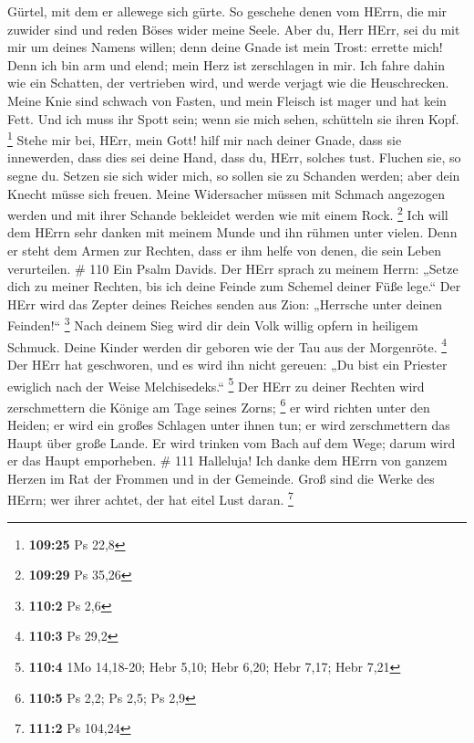 Gürtel, mit dem er allewege sich gürte.  So geschehe denen
vom HErrn, die mir zuwider sind und reden Böses wider meine Seele.
 Aber du, Herr HErr, sei du mit mir um deines Namens
willen; denn deine Gnade ist mein Trost: errette mich! 
Denn ich bin arm und elend; mein Herz ist zerschlagen in mir.
 Ich fahre dahin wie ein Schatten, der vertrieben wird, und
werde verjagt wie die Heuschrecken.  Meine Knie sind
schwach von Fasten, und mein Fleisch ist mager und hat kein Fett.
 Und ich muss ihr Spott sein; wenn sie mich sehen,
schütteln sie ihren Kopf. \footnote{\textbf{109:25} Ps 22,8}
 Stehe mir bei, HErr, mein Gott! hilf mir nach deiner
Gnade,  dass sie innewerden, dass dies sei deine Hand, dass
du, HErr, solches tust.  Fluchen sie, so segne du. Setzen
sie sich wider mich, so sollen sie zu Schanden werden; aber dein Knecht
müsse sich freuen.  Meine Widersacher müssen mit Schmach
angezogen werden und mit ihrer Schande bekleidet werden wie mit einem
Rock. \footnote{\textbf{109:29} Ps 35,26}  Ich will dem
HErrn sehr danken mit meinem Munde und ihn rühmen unter vielen.
 Denn er steht dem Armen zur Rechten, dass er ihm helfe von
denen, die sein Leben verurteilen. \# 110  Ein Psalm Davids.
Der HErr sprach zu meinem Herrn: „Setze dich zu meiner Rechten, bis ich
deine Feinde zum Schemel deiner Füße lege.``  Der HErr wird
das Zepter deines Reiches senden aus Zion: „Herrsche unter deinen
Feinden!{}`` \footnote{\textbf{110:2} Ps 2,6}  Nach deinem
Sieg wird dir dein Volk willig opfern in heiligem Schmuck. Deine Kinder
werden dir geboren wie der Tau aus der Morgenröte. \footnote{\textbf{110:3}
  Ps 29,2}  Der HErr hat geschworen, und es wird ihn nicht
gereuen: „Du bist ein Priester ewiglich nach der Weise Melchisedeks.``
\footnote{\textbf{110:4} 1Mo 14,18-20; Hebr 5,10; Hebr 6,20; Hebr 7,17;
  Hebr 7,21}  Der HErr zu deiner Rechten wird zerschmettern
die Könige am Tage seines Zorns; \footnote{\textbf{110:5} Ps 2,2; Ps
  2,5; Ps 2,9}  er wird richten unter den Heiden; er wird
ein großes Schlagen unter ihnen tun; er wird zerschmettern das Haupt
über große Lande.  Er wird trinken vom Bach auf dem Wege;
darum wird er das Haupt emporheben. \# 111  Halleluja! Ich
danke dem HErrn von ganzem Herzen im Rat der Frommen und in der
Gemeinde.  Groß sind die Werke des HErrn; wer ihrer achtet,
der hat eitel Lust daran. \footnote{\textbf{111:2} Ps 104,24}
